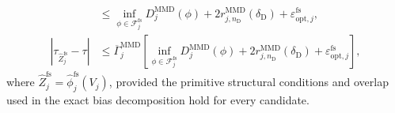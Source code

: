\begin{proposition}
\begin{align}
&\le
\inf_{\phi\in\mathcal F_j^{\mathrm{fs}}}
D_j^{\mathrm{MMD}}(\phi)
+2r_{j,n_{\mathrm D}}^{\mathrm{MMD}}(\delta_{\mathrm D})
+\varepsilon_{\mathrm{opt},j}^{\mathrm{fs}},
\label{eq:finite-mmd-oracle}\\
|\tau_{\widehat Z_j^{\mathrm{fs}}}-\tau|
&\le
\overline\Gamma_j^{\mathrm{MMD}}
\left[
\inf_{\phi\in\mathcal F_j^{\mathrm{fs}}}
D_j^{\mathrm{MMD}}(\phi)
+2r_{j,n_{\mathrm D}}^{\mathrm{MMD}}(\delta_{\mathrm D})
+\varepsilon_{\mathrm{opt},j}^{\mathrm{fs}}
\right],
\label{eq:finite-mmd-causal-oracle}
\end{align}
where $\widehat Z_j^{\mathrm{fs}}=\widehat\phi_j^{\mathrm{fs}}(V_j)$, provided the primitive structural conditions and overlap used in the exact bias decomposition hold for every candidate.
\end{proposition}

